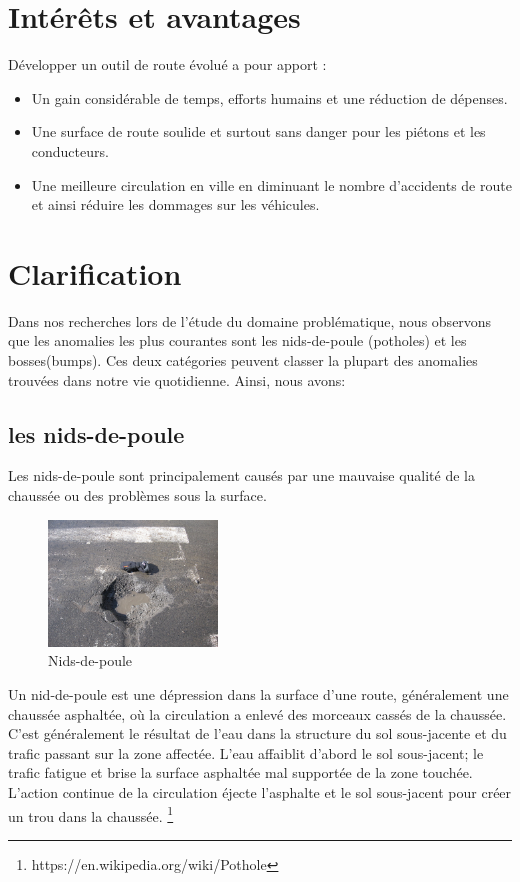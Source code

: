 \section{Intérêts et avantages}
Développer un outil de route évolué a pour apport :
\begin{itemize}
	\item Un gain considérable de temps, efforts humains et une réduction de dépenses.
    \item Une surface de route soulide et surtout sans danger pour les piétons et les conducteurs.
    \item Une meilleure circulation en ville en diminuant le nombre d'accidents de route et ainsi réduire les
     dommages sur les véhicules.
\end{itemize}

\section{Clarification}
Dans nos recherches lors de l'étude du domaine problématique, nous observons que les anomalies
 les plus courantes sont les nids-de-poule (potholes) et les bosses(bumps).
  Ces deux catégories peuvent classer la plupart des anomalies trouvées dans notre vie quotidienne. Ainsi, nous avons:

  \subsection{les nids-de-poule}

Les nids-de-poule sont principalement causés par une mauvaise qualité de la chaussée ou des problèmes sous la surface.
\begin{figure}[h!]
  \center
  \includegraphics[width=0.4\textwidth]{Images/chapter1/Pothole.jpg}
  \caption{Nids-de-poule}
  \end{figure}
  \newline Un nid-de-poule est une dépression dans la surface d'une route, généralement une chaussée asphaltée, où la circulation 
a enlevé des morceaux cassés de la chaussée. 
C'est généralement le résultat de l'eau dans la structure du sol sous-jacente et du trafic passant sur la zone affectée.
 L'eau affaiblit d'abord le sol sous-jacent; le trafic fatigue et brise la surface asphaltée mal supportée de la zone touchée.
 L'action continue de la circulation éjecte l'asphalte et le sol sous-jacent pour créer un trou dans la chaussée.
\footnote{https://en.wikipedia.org/wiki/Pothole}


